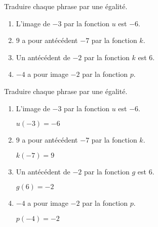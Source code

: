 \begin{exercice}
    Traduire chaque phrase par une égalité.
    \begin{enumerate}
        \item L'image de $-3$ par la fonction $u$ est $-6$.
        \item $9$ a pour antécédent  $-7$ par la fonction $k$.
        \item Un antécédent de $-2$ par la fonction $k$ est $6$.
        \item $-4$ a pour image $-2$ par la fonction $p$.
    \end{enumerate}
\end{exercice}
\begin{corrige}
    Traduire chaque phrase par une égalité.
    \begin{enumerate}
        \item L'image de $-3$ par la fonction $u$ est $-6$. 
        
        {\red $u(-3)=-6$}
        \item $9$ a pour antécédent  $-7$ par la fonction $k$.
        
        {\red $k(-7)=9$}
        \item Un antécédent de $-2$ par la fonction $g$ est $6$.
        
        {\red $g(6)=-2$}
        \item $-4$ a pour image $-2$ par la fonction $p$.
        
        {\red $p(-4)=-2$}
    \end{enumerate}
\end{corrige}
